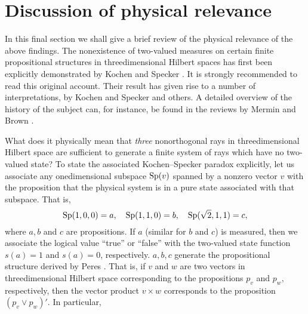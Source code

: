 \section {Discussion of physical relevance}
\label {Sdiscussion}



In this final section we shall give a brief review of the physical relevance
of the above findings. The nonexistence of two-valued measures on certain
finite propositional structures in threedimensional Hilbert spaces has first
been explicitly demonstrated by Kochen and Specker \cite{Kochen-Specker}. It
is strongly recommended to read this original account. Their result has
given rise to a number of interpretations, by Kochen and Specker and others.
A detailed overview of the history of the subject can, for instance, be
found in the reviews by Mermin \cite{Mermin} and Brown \cite{brown}.


What does it physically mean that {\em three\/} nonorthogonal rays in
threedimensional Hilbert space are sufficient to generate a finite system of
rays which have no two-valued state? To state the associated Kochen--Specker
paradox explicitly, let us associate any onedimensional subspace ${\rm Sp} (v)$
spanned by a nonzero vector $v$ with the proposition that the physical
system is in a pure state associated with that subspace. That is,
  $$
  {\rm Sp} (1,0,0) = a, \quad
  {\rm Sp} (1,1,0) = b, \quad
  {\rm Sp} (\sqrt{2},1,1) = c,
  $$
where $a,b$ and $c$ are propositions. If $a$ (similar for $b$ and $c$) is
measured, then we associate the logical value ``true''  or ``false'' with
the two-valued state function $s(a)=1$ and $s(a)=0$, respectively. $a,b,c$
generate the propositional structure derived by Peres \cite[pp.\
186--190]{Peres2,peres}. That is, if $v$ and $w$ are two vectors in
threedimensional Hilbert space corresponding to the propositions $p_v$ and
$p_w$, respectively, then the vector product $v \times w$ corresponds to the
proposition $(p_v \vee p_w)'$. In particular,

